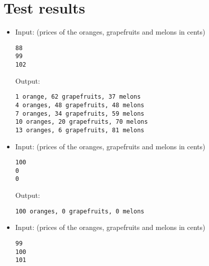 \documentclass[a4paper,10pt]{article}
\begin{document}
\section{Test results}

\begin{itemize}

\item Input: (prices of the oranges, grapefruits and melons in cents)
\begin{lstlisting}[style = stdio]
88
99
102
\end{lstlisting}

  Output:
\begin{lstlisting}[style = stdio]
1 orange, 62 grapefruits, 37 melons
4 oranges, 48 grapefruits, 48 melons
7 oranges, 34 grapefruits, 59 melons
10 oranges, 20 grapefruits, 70 melons
13 oranges, 6 grapefruits, 81 melons
\end{lstlisting}


\item Input: (prices of the oranges, grapefruits and melons in cents)
\begin{lstlisting}[style = stdio]
100
0
0
\end{lstlisting}

  Output:
\begin{lstlisting}[style = stdio]
100 oranges, 0 grapefruits, 0 melons
\end{lstlisting}


\item Input: (prices of the oranges, grapefruits and melons in cents)
\begin{lstlisting}[style = stdio]
99
100
101
\end{lstlisting}


\end{itemize}
\end{document}
